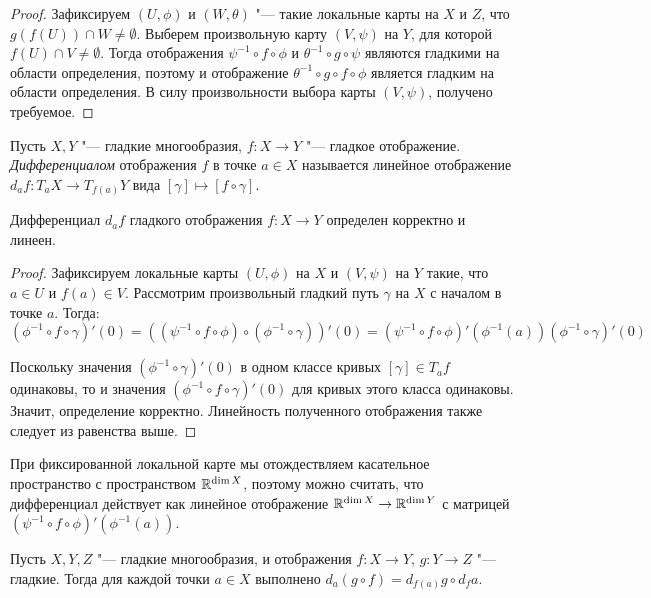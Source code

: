 \begin{proof}
	Зафиксируем $(U, \phi)$ и $(W, \theta)$ "--- такие локальные карты на $X$ и $Z$, что $g(f(U)) \cap W \ne \emptyset$. Выберем произвольную карту $(V, \psi)$ на $Y$, для которой $f(U) \cap V \ne \emptyset$. Тогда отображения $\psi^{-1} \circ f \circ \phi$ и $\theta^{-1} \circ g \circ \psi$ являются гладкими на области определения, поэтому и отображение $\theta^{-1} \circ g \circ f \circ \phi$ является гладким на области определения. В силу произвольности выбора карты $(V, \psi)$, получено требуемое.
\end{proof}

\begin{definition}
	Пусть $X, Y$ "--- гладкие многообразия, $f : X \to Y$ "--- гладкое отображение. \textit{Дифференциалом} отображения $f$ в точке $a \in X$ называется линейное отображение $d_af: T_aX \to T_{f(a)}Y$ вида $[\gamma] \mapsto [f \circ \gamma]$.
\end{definition}

\begin{proposition}
	Дифференциал $d_af$ гладкого отображения $f: X \to Y$ определен корректно и линеен.
\end{proposition}

\begin{proof}
	Зафиксируем локальные карты $(U, \phi)$ на $X$ и $(V, \psi)$ на $Y$ такие, что $a \in U$ и $f(a) \in V$. Рассмотрим произвольный гладкий путь $\gamma$ на $X$ с началом в точке $a$. Тогда:
	\[(\phi^{-1} \circ f \circ \gamma)'(0) = \left((\psi^{-1} \circ f \circ \phi) \circ (\phi^{-1} \circ \gamma)\right)'(0) = (\psi^{-1} \circ f \circ \phi)'(\phi^{-1}(a))(\phi^{-1} \circ \gamma)'(0)\]
	
	Поскольку значения $(\phi^{-1} \circ \gamma)'(0)$ в одном классе кривых $[\gamma] \in T_af$ одинаковы, то и значения $(\phi^{-1} \circ f \circ \gamma)'(0)$ для кривых этого класса одинаковы. Значит, определение корректно. Линейность полученного отображения также следует из равенства выше.
\end{proof}

\begin{note}
	При фиксированной локальной карте мы отождествляем касательное пространство с пространством $\mathbb{R}^{\dim{X}}$, поэтому можно считать, что дифференциал действует как линейное отображение $\mathbb{R}^{\dim{X}} \to \mathbb{R}^{\dim{Y}}$ с матрицей $(\psi^{-1} \circ f \circ \phi)'(\phi^{-1}(a))$.
\end{note}

\begin{proposition}
	Пусть $X, Y, Z$ "--- гладкие многообразия, и отображения $f : X \to Y$, $g : Y \to Z$ "--- гладкие. Тогда для каждой точки $a \in X$ выполнено $d_a(g\circ f) = d_{f(a)}g \circ d_fa$.
\end{proposition}

